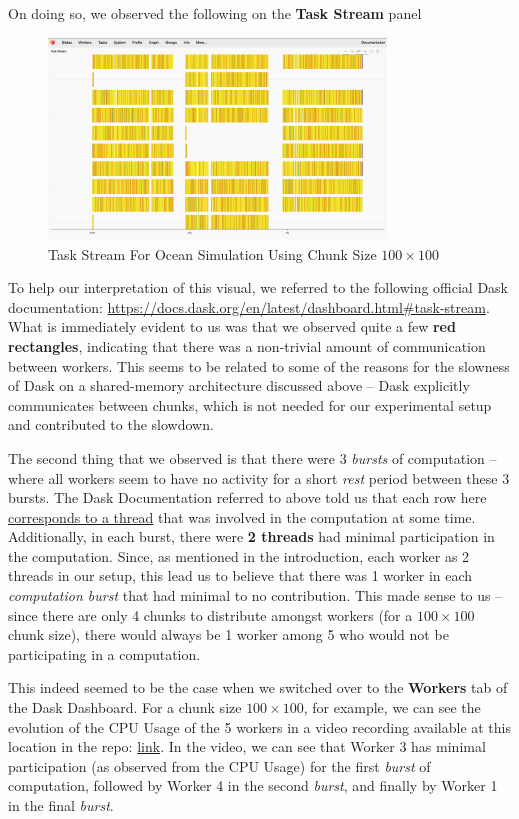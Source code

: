 \documentclass[a4paper,12pt]{article}
\begin{document}
On doing so, we observed the following on the \textbf{Task Stream} panel


\begin{figure}[H]
  \centering
  \includegraphics[width=0.8\textwidth]{../images/task_stream_100chunk.png}
  \caption{Task Stream For Ocean Simulation Using Chunk Size $100 \times 100$}
\end{figure}

To help our interpretation of this visual, we referred to the following official Dask documentation: \url{https://docs.dask.org/en/latest/dashboard.html#task-stream}. What is immediately evident to us was that we observed quite a few \textbf{red rectangles}, indicating that there was a non-trivial amount of communication between workers. This seems to be related to some of the reasons for the slowness of Dask on a shared-memory architecture discussed above -- Dask explicitly communicates between chunks, which is not needed for our experimental setup and contributed to the slowdown.  

The second thing that we observed is that there were 3 \textit{bursts} of computation -- where all workers seem to have no activity for a short \textit{rest} period between these 3 bursts. The Dask Documentation referred to above told us that each row here \underline{corresponds to a thread} that was involved in the computation at some time. Additionally, in each burst, there were \textbf{2 threads} had minimal participation in the computation. Since, as mentioned in the introduction, each worker as 2 threads in our setup, this lead us to believe that there was 1 worker in each \textit{computation burst} that had minimal to no contribution. This made sense to us -- since there are only 4 chunks to distribute amongst workers (for a $100 \times 100$ chunk size), there would always be 1 worker among 5 who would not be participating in a computation. 

This indeed seemed to be the case when we switched over to the \textbf{Workers} tab of the Dask Dashboard. For a chunk size $100 \times 100$, for example, we can see the evolution of the CPU Usage of the 5 workers in a video recording available at this location in the repo: \href{https://github.com/paulmyr/DD2358-HPC25/tree/master/04_parallel/bonus#chunk-size-100}{link}. In the video, we can see that Worker 3 has minimal participation (as observed from the CPU Usage) for the first \textit{burst} of computation, followed by Worker 4 in the second \textit{burst}, and finally by Worker 1 in the final \textit{burst}.
\end{document}
